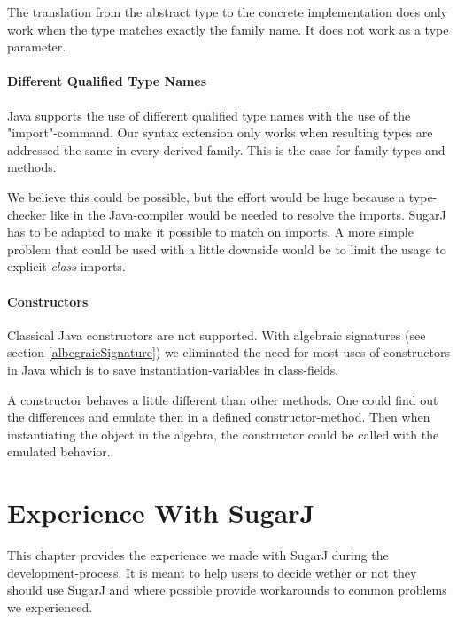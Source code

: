 \documentclass{report}
\begin{document}
The translation from the abstract type to the concrete implementation does only work when the type matches exactly the family name. It does not work as a type parameter.

\subsubsection*{Different Qualified Type Names}

Java supports the use of different qualified type names with the use of the "import"-command. Our syntax extension only works when resulting types are addressed the same in every derived family. This is the case for family types and methods.

We believe this could be possible, but the effort would be huge because a type-checker like in the Java-compiler would be needed to resolve the imports. SugarJ has to be adapted to make it possible to match on imports. A more simple problem that could be used with a little downside would be to limit the usage to explicit \emph{class} imports.

\subsubsection*{Constructors}

Classical Java constructors are not supported. With algebraic signatures (see section \ref{albegraicSignature}) we eliminated the need for most uses of constructors in Java which is to save instantiation-variables in class-fields.

A constructor behaves a little different than other methods. One could find out the differences and emulate then in a defined constructor-method. Then when instantiating the object in the algebra, the constructor could be called with the emulated behavior.


\chapter{Experience With SugarJ}
\label{sugarJChapter}

This chapter provides the experience we made with SugarJ during the development-process. It is meant to help users to decide wether or not they should use SugarJ and where possible provide workarounds to common problems we experienced.
\end{document}
